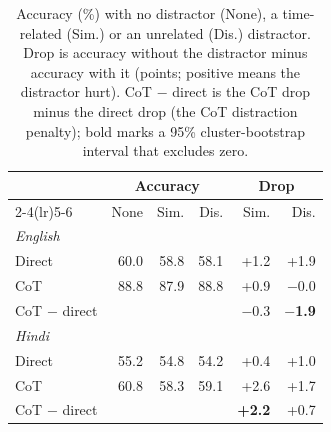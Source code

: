 \begin{table}[t]
\centering
\small
\setlength{\tabcolsep}{4pt}
\begin{tabular}{lrrrrr}
\toprule
 & \multicolumn{3}{c}{Accuracy} & \multicolumn{2}{c}{Drop} \\
\cmidrule(lr){2-4}\cmidrule(lr){5-6}
 & None & Sim. & Dis. & Sim. & Dis. \\
\midrule
\multicolumn{6}{l}{\textit{English}} \\
\quad Direct & 60.0 & 58.8 & 58.1 & +1.2 & +1.9 \\
\quad CoT & 88.8 & 87.9 & 88.8 & +0.9 & $-$0.0 \\
\quad CoT $-$ direct &  &  &  & $-$0.3 & \textbf{$-$1.9} \\
\midrule
\multicolumn{6}{l}{\textit{Hindi}} \\
\quad Direct & 55.2 & 54.8 & 54.2 & +0.4 & +1.0 \\
\quad CoT & 60.8 & 58.3 & 59.1 & +2.6 & +1.7 \\
\quad CoT $-$ direct &  &  &  & \textbf{+2.2} & +0.7 \\
\bottomrule
\end{tabular}
\caption{Accuracy (\%) with no distractor (None), a time-related (Sim.) or an unrelated (Dis.) distractor. Drop is accuracy without the distractor minus accuracy with it (points; positive means the distractor hurt). CoT $-$ direct is the CoT drop minus the direct drop (the CoT distraction penalty); bold marks a 95\% cluster-bootstrap interval that excludes zero.}
\label{tab:distractor}
\end{table}

